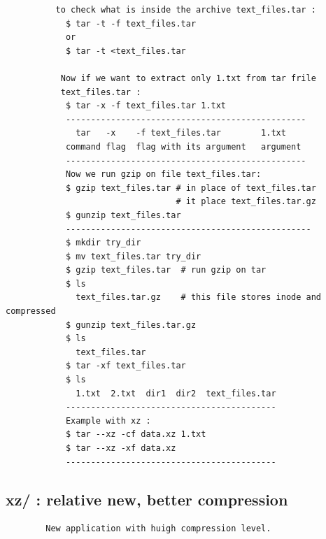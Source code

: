 \documentclass[a4paper,12pt]{article}
\begin{document}
\begin{verbatim}
          to check what is inside the archive text_files.tar : 
            $ tar -t -f text_files.tar 
            or
            $ tar -t <text_files.tar            
                      
           Now if we want to extract only 1.txt from tar frile 
           text_files.tar : 
            $ tar -x -f text_files.tar 1.txt
            ------------------------------------------------  
              tar   -x    -f text_files.tar        1.txt
            command flag  flag with its argument   argument        
            ------------------------------------------------
            Now we run gzip on file text_files.tar:
            $ gzip text_files.tar # in place of text_files.tar
                                  # it place text_files.tar.gz
            $ gunzip text_files.tar
            ------------------------------------------------- 
            $ mkdir try_dir
            $ mv text_files.tar try_dir
            $ gzip text_files.tar  # run gzip on tar
            $ ls
              text_files.tar.gz    # this file stores inode and compressed
            $ gunzip text_files.tar.gz
            $ ls
              text_files.tar
            $ tar -xf text_files.tar
            $ ls
              1.txt  2.txt  dir1  dir2  text_files.tar
            ------------------------------------------  
            Example with xz : 
            $ tar --xz -cf data.xz 1.txt  
            $ tar --xz -xf data.xz 
            ------------------------------------------ 

\end{verbatim}


\subsection{xz/  : relative new, better compression}
\begin{verbatim}
        New application with huigh compression level.
   
\end{verbatim}
\end{document}
